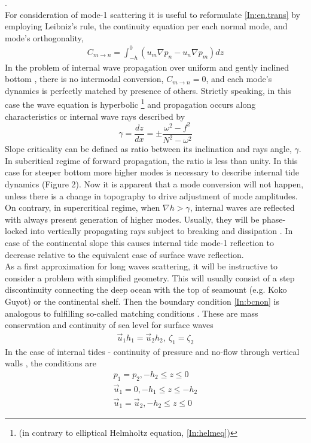 \documentclass[12pt]{article}
\begin{document}
\citep{kurapov2003m, llewellyn2002conversion, pickering2015structure}.\\
For consideration of mode-1 scattering it is useful to reformulate \eqref{In:en.trans} by employing 
Leibniz's rule, the continuity equation per each normal mode, and mode's orthogonality,
\begin{align}
C_{m \to n} = \int_{-h}^{0} (u_m \nabla p_n - u_n \nabla p_m) dz
\end{align}
In the problem of internal wave propagation over uniform and gently inclined bottom 
\citep{wunsch1968propagation}, there is no intermodal conversion, $C_{m \to n} = 0$, and each 
mode's dynamics is perfectly matched by presence of others. Strictly speaking, in this case the 
wave equation is hyperbolic \footnote{(in contrary to elliptical Helmholtz equation, 
\eqref{In:helmeq})} and propagation occurs along characteristics \citep{sandstrom1969effect} or 
internal wave rays described by
\begin{equation}
\label{In:ch.angle}
\gamma = \frac{dz}{dx} = \pm \frac{\omega^2 - f^2}{N^2 - \omega^2}
\end{equation}
Slope criticality can be defined as ratio between its inclination and rays angle, $\gamma$. In 
subcritical regime of forward propagation, the ratio is less than unity. In this case for steeper 
bottom more higher modes is necessary to describe internal tide dynamics (Figure 2). Now it is 
apparent that a mode conversion will not happen, unless there is a change in topography to drive 
adjustment of mode amplitudes. On contrary, in supercritical regime, when $\nabla h > \gamma$, 
internal waves are reflected with always present generation of higher modes. Usually, they will be 
phase-locked into vertically propagating rays \citep{garrett2007internal, 
lamb2014internal} subject to breaking and dissipation \citep{lien2001observations, 
nash2004internal, klymak2011breaking}. In case of the continental slope this causes internal tide 
mode-1 reflection to decrease relative to the equivalent case of surface wave reflection.\\
As a first approximation for long waves scattering, it will be instructive to consider a problem 
with simplified geometry. This will usually consist of a step discontinuity connecting the deep 
ocean with the top of seamount (e.g. Koko Guyot) or the continental shelf. Then the boundary 
condition \eqref{In:bcnon} is analogous to fulfilling so-called matching conditions 
\citep{mei1989theory}. These are mass conservation and continuity of sea level for surface waves
\begin{align}
\vec{u}_1 h_1 = \vec{u}_2 h_2,~\zeta_1 = \zeta_2
\end{align}
In the case of internal tides - continuity of pressure and no-flow through vertical walls 
\citep{st2002role, larsen1969internal, chapman1981scattering}, the conditions are
\begin{align}
p_1 = p_2, -h_2 \leq z \leq 0 \\
\vec{u}_1 = 0, -h_1 \leq z \leq -h_2\\
\vec{u}_1 = \vec{u}_2, -h_2 \leq z \leq 0
\end{align}
\end{document}
